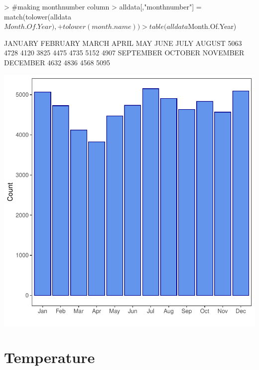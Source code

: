\documentclass[11pt, a4paper]{article}
\begin{document}
\begin{Schunk}
\begin{Sinput}
> #making monthnumber column
> alldata[,"monthnumber"] = match(tolower(alldata$Month.Of.Year), 
+                             tolower(month.name))
> table(alldata$Month.Of.Year)
\end{Sinput}
\begin{Soutput}
  JANUARY  FEBRUARY     MARCH     APRIL       MAY      JUNE      JULY    AUGUST 
     5063      4728      4120      3825      4475      4735      5152      4907 
SEPTEMBER   OCTOBER  NOVEMBER  DECEMBER 
     4632      4836      4568      5095 
\end{Soutput}
\end{Schunk}
\includegraphics{variableinvestigation-003}





\section{Temperature}
\end{document}
